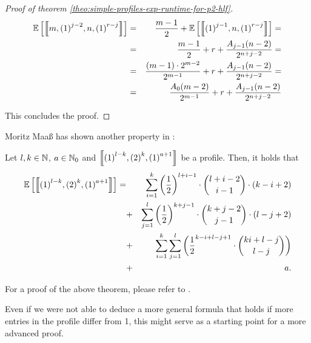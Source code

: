 \begin{proof}[Proof of theorem \ref{theo:simple-profiles-exp-runtime-for-p2-hlf}]
  \begin{eqnarray*}
    \mathbb{E}\left[ \left\llbracket m,{(1)}^{j-2},n,{(1)}^{r-j} \right\rrbracket \right]
    & = & 
    \frac{m-1}{2} + \mathbb{E}\left[ \left\llbracket {(1)}^{j-1},n,{(1)}^{r-j} \right\rrbracket \right] = \\
    & = &
    \frac{m-1}{2} + r + \frac{A_{j-1}(n-2)}{2^{n+j-2}} = \\
    & = &
    \frac{(m-1)\cdot 2^{m-2}}{2^{m-1}} + r + \frac{A_{j-1}(n-2)}{2^{n+j-2}} = \\
    & = &
    \frac{A_0(m-2)}{2^{m-1}} + r + \frac{A_{j-1}(n-2)}{2^{n+j-2}}
  \end{eqnarray*}
  
  This concludes the proof.
\end{proof}

Moritz Maaß has shown another property in \cite{MoritzMaasDiploma}:

\begin{theorem}
  Let $l, k\in\mathbb{N}$, $a\in\mathbb{N}_0$ and $\left\llbracket {(1)}^{l-k}, {(2)}^{k}, {(1)}^{a+1} \right\rrbracket$ be a profile. Then, it holds that
  \begin{eqnarray*}
    \mathbb{E}\left[ \left\llbracket {(1)}^{l-k}, {(2)}^{k}, {(1)}^{a+1} \right\rrbracket \right]
    = & &
    \sum_{i=1}^k \left(\frac{1}{2}\right)^{l+i-1} \cdot \binom{l+i-2}{i-1} \cdot \left( k-i+2 \right) \\
    & + & \sum_{j=1}^l \left(\frac{1}{2}\right)^{k+j-1} \cdot \binom{k+j-2}{j-1} \cdot \left( l-j+2 \right) \\
    & + & \sum_{i=1}^k \sum_{j=1}^l \left( \frac{1}{2}^{k-i+l-j+1}\cdot\binom{ki+l-j}{l-j} \right) \\
    & + & a
    .
  \end{eqnarray*}
\end{theorem}

For a proof of the above theorem, please refer to \cite{MoritzMaasDiploma}.

Even if we were not able to deduce a more general formula that holds if more entries in the profile differ from 1, this might serve as a starting point for a more advanced proof.



